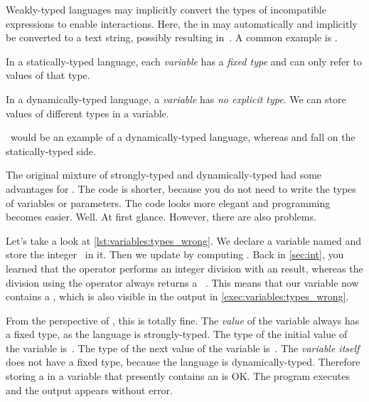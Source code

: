 %
Weakly-typed languages may implicitly convert the types of incompatible expressions to enable interactions.
Here, the  in  may automatically and implicitly be converted to a text string, possibly resulting in~.
A common example is .
%
\begin{definition}%
In a statically-typed language, each \emph{variable} has a \emph{fixed type} and can only refer to values of that type.%
\end{definition}%
%
\begin{definition}%
In a dynamically-typed language, a \emph{variable} has \emph{no explicit type}. %
We can store values of different types in a variable.%
\end{definition}%
%
\python\ would be an example of a dynamically-typed language, whereas  and  fall on the statically-typed side.

The original mixture of strongly-typed and dynamically-typed had some advantages for \python.
The code is shorter, because you do not need to write the types of variables or parameters.
The code looks more elegant and programming becomes easier.
Well.
At first glance.
However, there are also problems.

Let's take a look at \cref{lst:variables:types_wrong}.
We declare a variable named  and store the integer~ in it.
Then we update  by computing .
Back in \cref{sec:int}, you learned that the \pythonilIdx{//} operator performs an integer division with an  result, whereas the division using the \pythonilIdx{/} operator always returns a ~\cite{PEP238}.
This means that our variable  now contains a , which is also visible in the output in \cref{exec:variables:types_wrong}.

From the perspective of \python, this is totally fine.
The \emph{value} of the variable always has a fixed type, as the language is strongly-typed.
The type of the initial value of the variable is~.
The type of the next value of the variable is~.
The \emph{variable itself} does not have a fixed type, because the language is dynamically-typed.
Therefore storing a  in a variable that presently contains an  is OK.
The program executes and the output appears without error.

